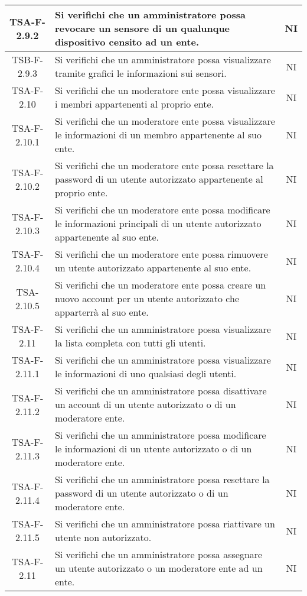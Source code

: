 \begin{center}
\begin{longtable}{|c|p{10cm}|c|}
			 TSA-F-2.9.2 & Si verifichi che un amministratore possa revocare un sensore di un qualunque dispositivo censito ad un ente. & NI \\
			 \hline
			 TSB-F-2.9.3 & Si verifichi che un amministratore possa visualizzare tramite grafici le informazioni sui sensori. & NI \\
			 \hline
			 TSA-F-2.10 &  Si verifichi che un moderatore ente possa visualizzare i membri appartenenti al proprio ente. & NI \\
			 \hline
			 TSA-F-2.10.1 & Si verifichi che un moderatore ente possa visualizzare le informazioni di un membro appartenente al suo ente. & NI \\
			 \hline
			 TSA-F-2.10.2 & Si verifichi che un moderatore ente possa resettare la password di un utente autorizzato appartenente al proprio ente. & NI \\
			 \hline
			 TSA-F-2.10.3 & Si verifichi che un moderatore ente possa modificare le informazioni principali di un utente autorizzato appartenente al suo ente. & NI \\
			 \hline
			 TSA-F-2.10.4 & Si verifichi che un moderatore ente possa rimuovere un utente autorizzato appartenente al suo ente. & NI \\
			 \hline 
			 TSA-2.10.5 & Si verifichi che un moderatore ente possa creare un nuovo account per un utente autorizzato che apparterrà al suo ente. & NI \\
			 \hline
			 TSA-F-2.11 & Si verifichi che un amministratore possa visualizzare la lista completa con tutti gli utenti. & NI \\
			 \hline
			 TSA-F-2.11.1 & Si verifichi che un amministratore possa visualizzare le informazioni di uno qualsiasi degli utenti. & NI \\
			 \hline
			 TSA-F-2.11.2 & Si verifichi che un amministratore possa disattivare un account di un utente autorizzato o di un moderatore ente. & NI \\
			 \hline
			 TSA-F-2.11.3 & Si verifichi che un amministratore possa modificare le informazioni di un utente autorizzato o di un moderatore ente. & NI \\
			 \hline
			 TSA-F-2.11.4 & Si verifichi che un amministratore possa resettare la password di un utente autorizzato o di un moderatore ente. & NI \\
			 \hline
			 TSA-F-2.11.5 & Si verifichi che un amministratore possa riattivare un utente non autorizzato. & NI \\
			 \hline
			 TSA-F-2.11 & Si verifichi che un amministratore possa assegnare un utente autorizzato o un moderatore ente ad un ente. & NI \\

\end{longtable}
\end{center}
